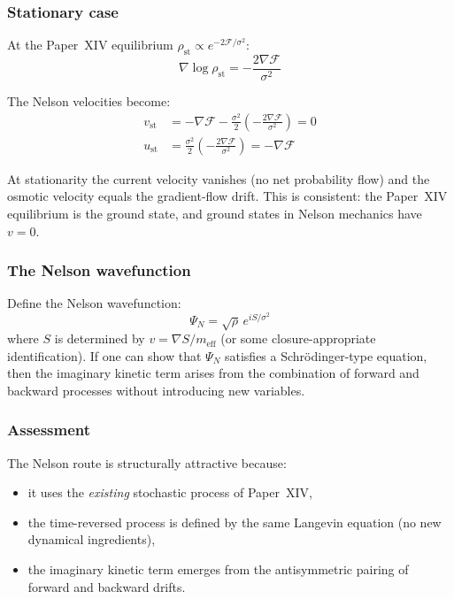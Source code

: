 \documentclass[12pt]{article}
\newcommand{\Fcal}{\mathcal{F}}
\begin{document}
\subsubsection*{Stationary case}

At the Paper~XIV equilibrium $\rho_{\mathrm{st}} \propto e^{-2\Fcal/\sigma^2}$:
\begin{equation}
    \nabla\log\rho_{\mathrm{st}} = -\frac{2\nabla\Fcal}{\sigma^2}
\end{equation}

The Nelson velocities become:
\begin{align}
    v_{\mathrm{st}} &= -\nabla\Fcal - \frac{\sigma^2}{2}\left(-\frac{2\nabla\Fcal}{\sigma^2}\right) = 0 \\
    u_{\mathrm{st}} &= \frac{\sigma^2}{2}\left(-\frac{2\nabla\Fcal}{\sigma^2}\right) = -\nabla\Fcal
\end{align}

At stationarity the current velocity vanishes (no net probability flow) and the osmotic velocity equals the gradient-flow drift. This is consistent: the Paper~XIV equilibrium is the ground state, and ground states in Nelson mechanics have $v = 0$.

\subsubsection*{The Nelson wavefunction}

Define the Nelson wavefunction:
\begin{equation}\label{eq:nelson_psi}
    \Psi_N = \sqrt{\rho}\, e^{iS/\sigma^2}
\end{equation}
where $S$ is determined by $v = \nabla S/m_{\mathrm{eff}}$ (or some closure-appropriate identification). If one can show that $\Psi_N$ satisfies a Schr\"odinger-type equation, then the imaginary kinetic term arises from the combination of forward and backward processes without introducing new variables.

\subsubsection*{Assessment}

The Nelson route is structurally attractive because:
\begin{itemize}
    \item it uses the \textit{existing} stochastic process of Paper~XIV,
    \item the time-reversed process is defined by the same Langevin equation (no new dynamical ingredients),
    \item the imaginary kinetic term emerges from the antisymmetric pairing of forward and backward drifts.
\end{itemize}
\end{document}

